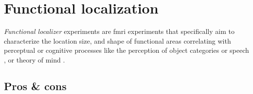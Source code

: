 \section{Functional localization}

\textit{Functional localizer} experiments \citep[cf.,][for
reviews]{saxe2006divide, friston2006critique} are \ac{fmri} experiments that
specifically aim to characterize the location size, and shape of functional
areas correlating with perceptual or cognitive processes like the perception of
object categories \citep{kanwisher1997ffa} or speech
\citep{fernandez2001language}, or theory of mind \citep{spunt2014validating}.


\subsection{Pros \& cons}


